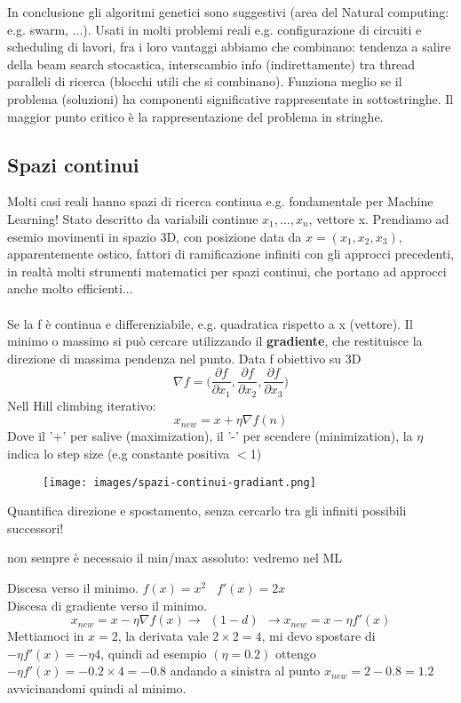 \hspace{-15pt}In conclusione gli algoritmi genetici sono suggestivi (area del Natural computing: e.g. swarm, ...). Usati in molti problemi reali e.g. configurazione di
circuiti e scheduling di lavori, fra i loro vantaggi abbiamo che combinano: tendenza a salire della beam search stocastica, interscambio info (indirettamente) tra thread paralleli di
ricerca (blocchi utili che si combinano). Funziona meglio se il problema (soluzioni) ha componenti significative rappresentate in sottostringhe.
Il maggior punto critico è la rappresentazione del problema in stringhe.

\subsection{Spazi continui}
Molti casi reali hanno spazi di ricerca continua e.g. fondamentale per Machine Learning! Stato descritto da variabili continue $x_1, \dots, x_n$, vettore x.
Prendiamo ad esemio movimenti in spazio 3D, con posizione data da $x = (x_1, x_2, x_3)$, apparentemente ostico, fattori di ramificazione infiniti con gli
approcci precedenti, in realtà molti strumenti matematici per spazi continui, che portano ad approcci anche molto efficienti...\\\\
Se la f è continua e differenziabile, e.g. quadratica rispetto a x (vettore). Il minimo o massimo si può cercare utilizzando il \textbf{gradiente}, che restituisce la
direzione di massima pendenza nel punto. Data f obiettivo su 3D
$$\nabla f = \Big ( \frac{\partial f}{\partial x_1}, \frac{\partial f}{\partial x_2}, \frac{\partial f}{\partial x_3} \Big)$$
Nell Hill climbing iterativo: $$x_{new} = x + \eta\nabla f(n)$$
Dove il '+' per salive (maximization), il '-' per scendere (minimization), la $\eta$ indica lo step size (e.g constante positiva $<$1)
\begin{figure}[h!]
    \centering
    \texttt{[image: images/spazi-continui-gradiant.png]}
\end{figure}
Quantifica direzione e spostamento, senza cercarlo tra gli infiniti possibili successori!
\begin{note}
    non sempre è necessaio il min/max assoluto: vedremo nel ML
\end{note}
\begin{example}
    Discesa verso il minimo. $f(x) = x^2 \hspace{10pt} f'(x) = 2x$\\
    Discesa di gradiente verso il minimo. 
    $$x_{new} = x - \eta \nabla f(x) \to \:\:(1-d) \:\: \to x_{new} = x - \eta f'(x)$$
    Mettiamoci in $x=2$, la derivata vale $2 \times 2=4$, mi devo spostare di $-\eta f'(x) = -\eta4$, quindi ad esempio $(\eta = 0.2)$ ottengo $-\eta f'(x) = -0.2 \times 4 = -0.8$ andando a sinistra al punto $x_{new} = 2 - 0.8 = 1.2$ avvicinandomi quindi al minimo.
\end{example}

